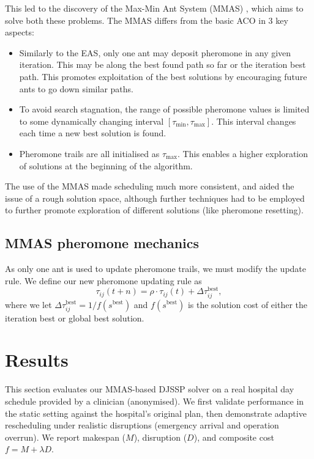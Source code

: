 \documentclass[final-report]{report-template}
\begin{document}
This led to the discovery of the Max-Min Ant System (MMAS) \cite{STUTZLE2000889}, which aims to solve both these problems. The MMAS differs from the basic ACO in 3 key aspects:
\begin{itemize}
    \item Similarly to the EAS, only one ant may deposit pheromone in any given iteration. This may be along the best found path so far or the iteration best path. This promotes exploitation of the best solutions by encouraging future ants to go down similar paths.
    \item To avoid search stagnation, the range of possible pheromone values is limited to some dynamically changing interval $[\tau_{\text{min}}, \tau_{\text{max}}]$. This interval changes each time a new best solution is found.
    \item Pheromone trails are all initialised as $\tau_{\text{max}}$. This enables a higher exploration of solutions at the beginning of the algorithm.
\end{itemize}
The use of the MMAS made scheduling much more consistent, and aided the issue of a rough solution space, although further techniques had to be employed to further promote exploration of different solutions (like pheromone resetting).


\subsection{MMAS pheromone mechanics}
As only one ant is used to update pheromone trails, we must modify the update rule. We define our new pheromone updating rule as 
\begin{equation*}
    \tau_{ij}(t + n) = \rho\cdot\tau_{ij}(t) + \Delta\tau_{ij}^{\text{best}},
\end{equation*}
where we let $\Delta\tau_{ij}^{\text{best}} = 1 / f(s^{\text{best}})$ and $f(s^{\text{best}})$ is the solution cost of either the iteration best or global best solution.

\section{Results}
This section evaluates our MMAS-based DJSSP solver on a real hospital day schedule provided by a clinician (anonymised). We first validate performance in the static setting against the hospital's original plan, then demonstrate adaptive rescheduling under realistic disruptions (emergency arrival and operation overrun). We report makespan ($M$), disruption ($D$), and composite cost $f = M + \lambda D$.
\end{document}
